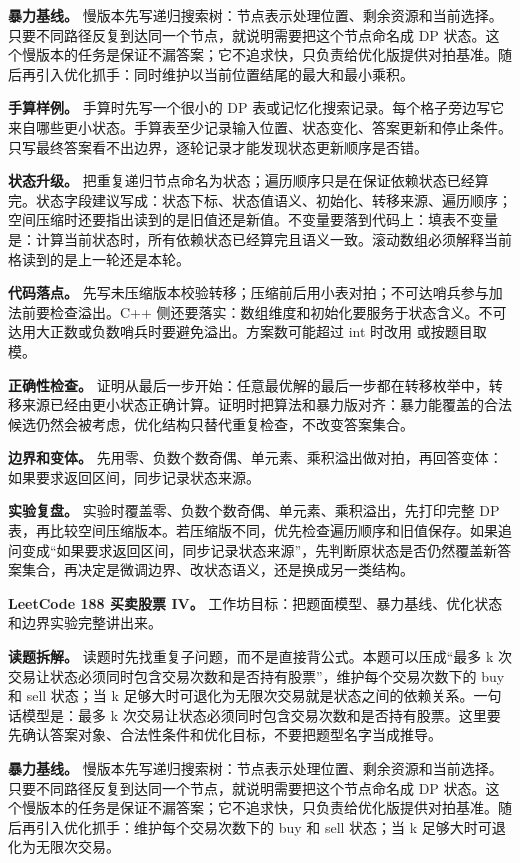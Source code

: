 \textbf{暴力基线。} 慢版本先写递归搜索树：节点表示处理位置、剩余资源和当前选择。只要不同路径反复到达同一个节点，就说明需要把这个节点命名成 DP 状态。这个慢版本的任务是保证不漏答案；它不追求快，只负责给优化版提供对拍基准。随后再引入优化抓手：同时维护以当前位置结尾的最大和最小乘积。

\textbf{手算样例。} 手算时先写一个很小的 DP 表或记忆化搜索记录。每个格子旁边写它来自哪些更小状态。手算表至少记录输入位置、状态变化、答案更新和停止条件。只写最终答案看不出边界，逐轮记录才能发现状态更新顺序是否错。

\textbf{状态升级。} 把重复递归节点命名为状态；遍历顺序只是在保证依赖状态已经算完。状态字段建议写成：状态下标、状态值语义、初始化、转移来源、遍历顺序；空间压缩时还要指出读到的是旧值还是新值。不变量要落到代码上：填表不变量是：计算当前状态时，所有依赖状态已经算完且语义一致。滚动数组必须解释当前格读到的是上一轮还是本轮。

\textbf{代码落点。} 先写未压缩版本校验转移；压缩前后用小表对拍；不可达哨兵参与加法前要检查溢出。C++ 侧还要落实：数组维度和初始化要服务于状态含义。不可达用大正数或负数哨兵时要避免溢出。方案数可能超过 int 时改用  或按题目取模。

\textbf{正确性检查。} 证明从最后一步开始：任意最优解的最后一步都在转移枚举中，转移来源已经由更小状态正确计算。证明时把算法和暴力版对齐：暴力能覆盖的合法候选仍然会被考虑，优化结构只替代重复检查，不改变答案集合。

\textbf{边界和变体。} 先用零、负数个数奇偶、单元素、乘积溢出做对拍，再回答变体：如果要求返回区间，同步记录状态来源。

\textbf{实验复盘。} 实验时覆盖零、负数个数奇偶、单元素、乘积溢出，先打印完整 DP 表，再比较空间压缩版本。若压缩版不同，优先检查遍历顺序和旧值保存。如果追问变成“如果要求返回区间，同步记录状态来源”，先判断原状态是否仍然覆盖新答案集合，再决定是微调边界、改状态语义，还是换成另一类结构。

\noindent\textbf{LeetCode 188 买卖股票 IV。} 工作坊目标：把题面模型、暴力基线、优化状态和边界实验完整讲出来。

\textbf{读题拆解。} 读题时先找重复子问题，而不是直接背公式。本题可以压成“最多 k 次交易让状态必须同时包含交易次数和是否持有股票”，维护每个交易次数下的 buy 和 sell 状态；当 k 足够大时可退化为无限次交易就是状态之间的依赖关系。一句话模型是：最多 k 次交易让状态必须同时包含交易次数和是否持有股票。这里要先确认答案对象、合法性条件和优化目标，不要把题型名字当成推导。

\textbf{暴力基线。} 慢版本先写递归搜索树：节点表示处理位置、剩余资源和当前选择。只要不同路径反复到达同一个节点，就说明需要把这个节点命名成 DP 状态。这个慢版本的任务是保证不漏答案；它不追求快，只负责给优化版提供对拍基准。随后再引入优化抓手：维护每个交易次数下的 buy 和 sell 状态；当 k 足够大时可退化为无限次交易。

